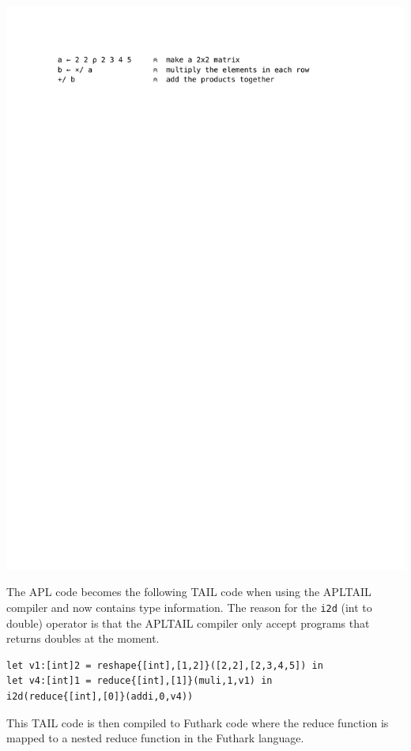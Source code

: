 \documentclass[11pt]{article}
\begin{document}
\includegraphics[scale=0.7,trim=6em 72em 10em 6em,clip=true]{reduce}

The APL code becomes the following TAIL code when using the APLTAIL compiler and now contains type information. The reason for the {\tt i2d} (int to double) operator is that the APLTAIL compiler only accept programs that returns doubles at the moment.


\begin{lstlisting}[numbers=none,frame=none,language=TAIL]
let v1:[int]2 = reshape{[int],[1,2]}([2,2],[2,3,4,5]) in
let v4:[int]1 = reduce{[int],[1]}(muli,1,v1) in
i2d(reduce{[int],[0]}(addi,0,v4))
\end{lstlisting}

This TAIL code is then compiled to Futhark code where the reduce function is mapped to a nested reduce function in the Futhark language. 
\end{document}
